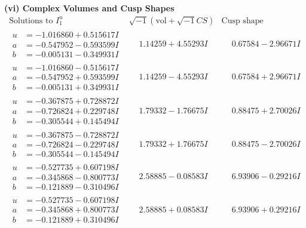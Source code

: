 \documentclass[1p]{elsarticle_modified}
\theoremstyle{definition}
\newcommand{\I}{\sqrt{-1}}
\begin{document}
\newpage\flushleft \textbf{(vi) Complex Volumes and Cusp Shapes}
$$\begin{array}{c|c|c}  
\text{Solutions to }I^u_{1}& \I (\text{vol} + \sqrt{-1}CS) & \text{Cusp shape}\\
 \hline 
\begin{aligned}
u &= -1.016860 + 0.515617 I \\
a &= -0.547952 - 0.593599 I \\
b &= -0.005131 - 0.349931 I\end{aligned}
 & \phantom{-}1.14259 + 4.55293 I & \phantom{-}0.67584 - 2.96671 I \\ \hline\begin{aligned}
u &= -1.016860 - 0.515617 I \\
a &= -0.547952 + 0.593599 I \\
b &= -0.005131 + 0.349931 I\end{aligned}
 & \phantom{-}1.14259 - 4.55293 I & \phantom{-}0.67584 + 2.96671 I \\ \hline\begin{aligned}
u &= -0.367875 + 0.728872 I \\
a &= -0.726824 + 0.229748 I \\
b &= -0.305544 + 0.145494 I\end{aligned}
 & \phantom{-}1.79332 - 1.76675 I & \phantom{-}0.88475 + 2.70026 I \\ \hline\begin{aligned}
u &= -0.367875 - 0.728872 I \\
a &= -0.726824 - 0.229748 I \\
b &= -0.305544 - 0.145494 I\end{aligned}
 & \phantom{-}1.79332 + 1.76675 I & \phantom{-}0.88475 - 2.70026 I \\ \hline\begin{aligned}
u &= -0.527735 + 0.607198 I \\
a &= -0.345868 - 0.800773 I \\
b &= -0.121889 - 0.310496 I\end{aligned}
 & \phantom{-}2.58885 - 0.08583 I & \phantom{-}6.93906 - 0.29216 I \\ \hline\begin{aligned}
u &= -0.527735 - 0.607198 I \\
a &= -0.345868 + 0.800773 I \\
b &= -0.121889 + 0.310496 I\end{aligned}
 & \phantom{-}2.58885 + 0.08583 I & \phantom{-}6.93906 + 0.29216 I \\ \hline\begin{aligned}

\end{aligned}
\end{array}$$
\end{document}
